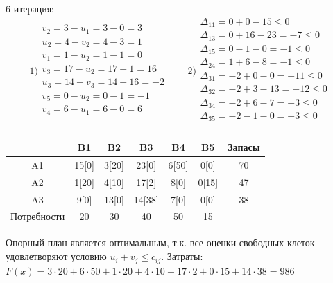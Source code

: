 \documentclass[a4paper, 12pt]{article}
\begin{document}
6-итерация:\\
\begin{equation*}
  1)\begin{split}
    v_2= 3 - u_1 = 3-0 = 3\\
    u_2= 4 - v_2 = 4-3 = 1\\
    v_1= 1 - u_2 = 1-1 = 0\\
    v_3= 17 - u_2 = 17-1 = 16\\
    u_3= 14 - v_3 = 14-16 = -2\\
    v_5= 0 - u_2 = 0-1 = -1\\
    v_4= 6 - u_1 = 6-0 = 6\\
  \end{split}
  \qquad  
  2)\begin{split}
    \Delta_{11} = 0+0-15 \leq 0 \\
    \Delta_{13} = 0+16-23 = -7 \leq 0 \\
    \Delta_{15} = 0-1-0 = -1 \leq 0 \\
    \Delta_{24} = 1+6-8 = -1 \leq 0 \\
    \Delta_{31} = -2+0-0 = -11 \leq 0 \\
    \Delta_{32} = -2+3-13 = -12 \leq 0 \\
    \Delta_{34} = -2+6-7 = -3 \leq 0 \\
    \Delta_{35} = -2-1-0 = -3 \leq 0 \\
  \end{split}
\end{equation*}

\begin{table}[H]
\centering
\begin{tabular}{|c|c|c|c|c|c|c|}
\hline
     & B1       & B2       & B3        & B4        & B5        & Запасы \\ \hline
A1   & 15[0]    & 3[20]    & 23[0]     & 6[50]     & 0[0]      & 70     \\ \hline
A2   & 1[20]    & 4[10]    & 17[2]     & 8[0]      & 0[15]     & 47     \\ \hline
A3   & 9[0]     & 13[0]    & 14[38]    & 7[0]      & 0[0]      & 38     \\ \hline
Потребности & 20       & 30       & 40        & 50        & 15        &        \\ \hline
\end{tabular}
\end{table}

Опорный план является оптимальным, т.к. все оценки свободных клеток удовлетворяют условию $u_i+v_j\leq c_{ij}$. Затраты: $F(x)=3\cdot20+6\cdot50+1\cdot20+4\cdot10+17\cdot2+0\cdot15+14\cdot38 = 986$

\end{document}
